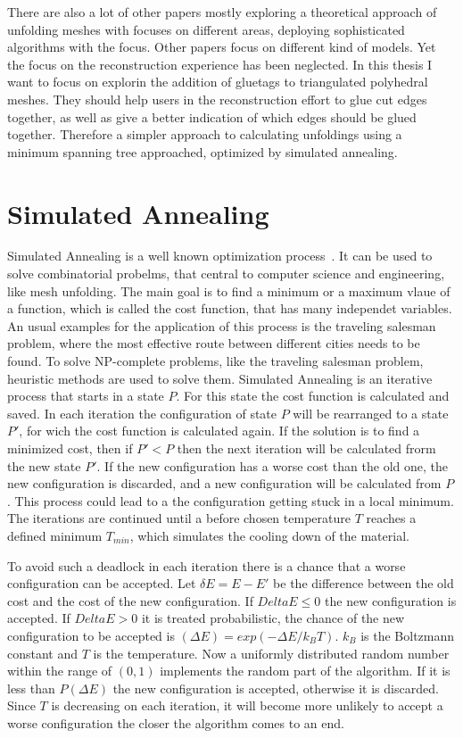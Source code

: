 \documentclass[draft,final]{vutinfth} %
\begin{document}
There are also a lot of other papers mostly exploring a theoretical approach of unfolding meshes with focuses on different areas, deploying sophisticated algorithms with the focus. Other papers focus on different kind of models. Yet the focus on the reconstruction experience has been neglected. In this thesis I want to focus on explorin the addition of gluetags to triangulated polyhedral meshes. They should help users in the reconstruction effort to glue cut edges together, as well as give a better indication of which edges should be glued together. Therefore a simpler approach to calculating unfoldings using a minimum spanning tree approached, optimized by simulated annealing.

\section{Simulated Annealing}
\label{sec:sa}
Simulated Annealing is a well known optimization process~\cite{kirkpatrick1983optimization}. It can be used to solve combinatorial probelms, that central to computer science and engineering, like mesh unfolding. The main goal is to find a minimum or a maximum vlaue of a function, which is called the cost function, that has many independet variables. An usual examples for the application of this process is the traveling salesman problem, where the most effective route between different cities needs to be found. To solve NP-complete problems, like the traveling salesman problem, heuristic methods are used to solve them.
Simulated Annealing is an iterative process that starts in a state $P$. For this state the cost function is calculated and saved. In each iteration the configuration of state $P$ will be rearranged to a state $P'$, for wich the cost function is calculated again. If the solution is to find a minimized cost, then if $P' < P$ then the next iteration will be calculated frorm the new state $P'$. If the new configuration has a worse cost than the old one, the new configuration is discarded, and a new configuration will be calculated from $P$. This process could lead to a the configuration getting stuck in a local minimum. The iterations are continued until a before chosen temperature $T$ reaches a defined minimum $T_{min}$, which simulates the cooling down of the material.

To avoid such a deadlock in each iteration there is a chance that a worse configuration can be accepted. Let $\delta E = E - E'$ be the difference between the old cost and the cost of the new configuration. If $Delta E \leq 0$ the new configuration is accepted. If $Delta E > 0$ it is treated probabilistic, the chance of the new configuration to be accepted is $(\Delta E) = exp(-\Delta E / k_B T)$. $k_B$ is the Boltzmann constant and $T$ is the temperature. Now a uniformly distributed random number within the range of $(0,1)$ implements the random part of the algorithm. If it is less than $P(\Delta E)$ the new configuration is accepted, otherwise it is discarded. Since $T$ is decreasing on each iteration, it will become more unlikely to accept a worse configuration the closer the algorithm comes to an end.
\end{document}
